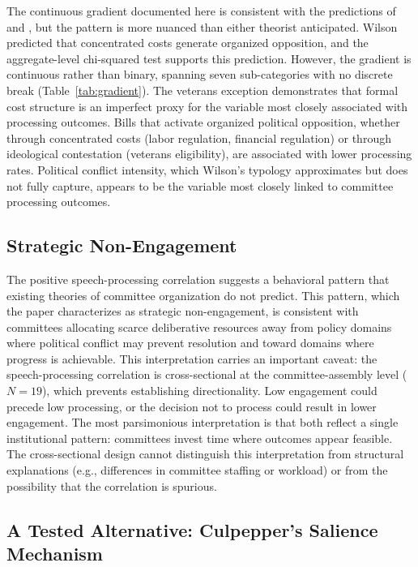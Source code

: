 \documentclass[11pt]{article}
\begin{document}
The continuous gradient documented here is consistent with the predictions of \citet{lowi1964} and \citet{wilson1980}, but the pattern is more nuanced than either theorist anticipated. Wilson predicted that concentrated costs generate organized opposition, and the aggregate-level chi-squared test supports this prediction. However, the gradient is continuous rather than binary, spanning seven sub-categories with no discrete break (Table~\ref{tab:gradient}). The veterans exception demonstrates that formal cost structure is an imperfect proxy for the variable most closely associated with processing outcomes. Bills that activate organized political opposition, whether through concentrated costs (labor regulation, financial regulation) or through ideological contestation (veterans eligibility), are associated with lower processing rates. Political conflict intensity, which Wilson's typology approximates but does not fully capture, appears to be the variable most closely linked to committee processing outcomes.

\subsection{Strategic Non-Engagement}

The positive speech-processing correlation suggests a behavioral pattern that existing theories of committee organization do not predict. This pattern, which the paper characterizes as strategic non-engagement, is consistent with committees allocating scarce deliberative resources away from policy domains where political conflict may prevent resolution and toward domains where progress is achievable. This interpretation carries an important caveat: the speech-processing correlation is cross-sectional at the committee-assembly level ($N = 19$), which prevents establishing directionality. Low engagement could precede low processing, or the decision not to process could result in lower engagement. The most parsimonious interpretation is that both reflect a single institutional pattern: committees invest time where outcomes appear feasible. The cross-sectional design cannot distinguish this interpretation from structural explanations (e.g., differences in committee staffing or workload) or from the possibility that the correlation is spurious.

\subsection{A Tested Alternative: Culpepper's Salience Mechanism}
\end{document}
